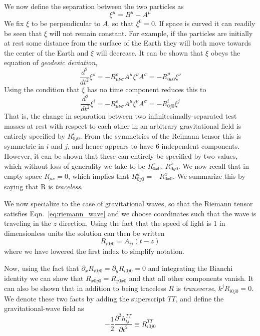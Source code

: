 We now define the separation between the two particles as 
%
\begin{equation*}
\xi^\mu = B^\mu - A^\mu
\end{equation*}
%
We fix $\xi$ to be perpendicular to $A$, so that $\xi^0 = 0$.  If space
is curved it can readily be seen that $\xi$ will not remain constant.
For example, if the particles are initially at rest some distance from
the surface of the Earth they will both move towards the center of the
Earth and $\xi$ will decrease.  It can be shown that $\xi$ obeys the
equation of \emph{geodesic deviation},
%
\begin{equation}
\label{eq:geodesic_deviation}
\frac{d^2}{dt^2} \xi^\rho = -R^\rho_{\mu\nu\sigma} A^\mu \xi^\nu A^\sigma
=-R^\rho_{0 \nu 0} \xi^\nu 
\end{equation}
%
Using the condition that $\xi$ has no time component reduces this to 
%
\begin{equation}
\frac{d^2}{dt^2} \xi^i = -R^\rho_{\mu\nu\sigma} A^\mu \xi^\nu A^\sigma
=-R^i_{0 j 0} \xi^j
\end{equation}
%
That is, the change in separation between two
infinitesimally-separated test masses at rest with respect to each
other in an arbitrary gravitational field is entirely specified by
$R^i_{0 j 0}$.  From the symmetries of the Reimann tensor this is
symmetric in $i$ and $j$, and hence appears to have 6 independent
components.  However, it can be shown that these can entirely be
specified by two values, which without loss of generality we take to
be $R^x_{0 x 0}$.  $R^x_{0 y 0}$.  We now recall that in empty space
$R_{\mu\nu} = 0$, which implies that $R^y_{0 y 0} = - R^x_{0 x 0}$.
We summarize this by saying that R is \emph{traceless}.  

We now specialize to the case of gravitational waves, so that the
Riemann tensor satisfies Eqn.~\ref{eq:riemann_wave} and we choose
coordinates such that the wave is traveling in the $z$ direction.
Using the fact that the speed of light is 1 in dimensionless units the
solution can then be written
%
\begin{equation*}
R_{i 0 j 0} = A_{ij}(t - z)
\end{equation*}
%
where we have lowered the first index to simplify notation.

Now, using the fact that $\partial_x R_{i0j0} = \partial_y R_{i0j0}
= 0$ and integrating the Bianchi identity we can show that
$R_{x 0 y 0} = R_{y 0 x 0}$ and that all other components vanish.
It can also be shown that in addition to being traceless $R$ is
\emph{transverse}, $k^j R_{i0j0} = 0$.  We denote these two facts by
adding the superscript $TT$, and define the gravitational-wave field as
%
\begin{equation}
\label{eq:wave_field}
-\frac{1}{2} \frac{\partial^2 h_{ij}^{TT}}{\partial t^2}
\equiv R^{TT}_{i0j0}
\end{equation}

